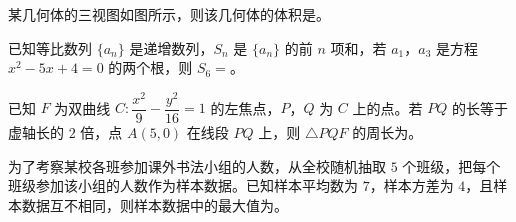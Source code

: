 \Needspace{0.4\textheight}
\begin{question}
某几何体的三视图如图所示，则该几何体的体积是\gkblank{}。
\nopagebreak[4]
\begin{center}\end{center}
\nopagebreak[4]
\end{question}
\begin{question}
已知等比数列 $\{a_n\}$ 是递增数列，$S_n$ 是 $\{a_n\}$ 的前 $n$ 项和，若 $a_1$，$a_3$ 是方程 $x^2-5x+4=0$ 的两个根，则 $S_6=$\gkblank{}。

\end{question}
\begin{question}
已知 $F$ 为双曲线 $C:\dfrac{x^2}{9}-\dfrac{y^2}{16}=1$ 的左焦点，$P$，$Q$ 为 $C$ 上的点。若 $PQ$ 的长等于虚轴长的 $2$ 倍，点 $A(5,0)$ 在线段 $PQ$ 上，则 $\triangle PQF$ 的周长为\gkblank{}。

\end{question}
\begin{question}
为了考察某校各班参加课外书法小组的人数，从全校随机抽取 $5$ 个班级，把每个班级参加该小组的人数作为样本数据。已知样本平均数为 $7$，样本方差为 $4$，且样本数据互不相同，则样本数据中的最大值为\gkblank{}。

\end{question}

